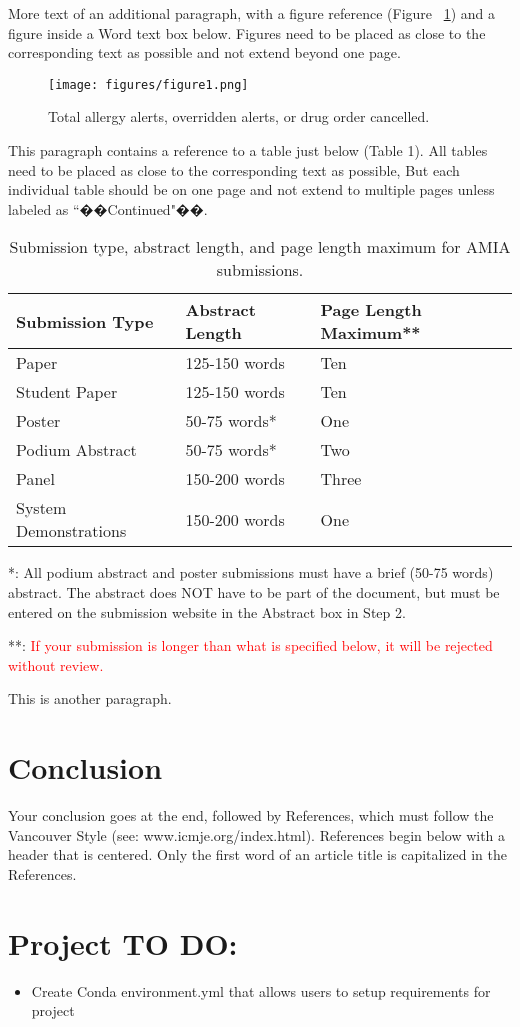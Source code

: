 \documentclass{amia}
\begin{document}
More text of an additional paragraph, with a figure reference (Figure ~\ref{fig1}) and a figure inside a Word text box
below.  Figures need to be placed as close to the corresponding text as possible and not extend beyond one page.\\
\begin{figure}[h!]
\centering
\texttt{[image: figures/figure1.png]}
\caption{Total allergy alerts, overridden alerts, or drug order cancelled.}
\label{fig1}
\end{figure}

This paragraph contains a reference to a table just below (Table 1).  All tables need to be placed as close to the 
corresponding text as possible, But each individual table should be on one page and not extend to multiple pages
 unless labeled as ``��Continued"��.

\begin{table}[h]
\centering
\caption{Submission type, abstract length, and page length maximum for AMIA submissions.}
  \begin{tabular}{|l|l|l|}
  \hline
    \textbf{Submission Type}    & \textbf{Abstract Length}  & \textbf{Page Length Maximum**} \\ \hline
    Paper  & 125-150 words  & Ten   \\ \hline
    Student Paper  & 125-150 words  & Ten \\ \hline
    Poster  &50-75 words*   & One \\ \hline
    Podium  Abstract & 50-75 words*  & Two \\ \hline
    Panel   &150-200 words  & Three \\ \hline
    System Demonstrations    &150-200 words  & One \\ \hline
  \end{tabular}
\end{table}
*: All podium abstract and poster submissions must have a brief (50-75 words) abstract. The abstract does NOT have to be part of the document, but must be entered on the submission website in the Abstract box in Step 2.

**: \textcolor{red}{If your submission is longer than what is specified below, it will be rejected without review.}

This is another paragraph.

\section*{Conclusion}
Your conclusion goes at the end, followed by References, which must follow the Vancouver Style (see: www.icmje.org/index.html).  References begin below with a header that is centered.  Only the first word of an article title is capitalized in the References. 

\section*{Project TO DO:}

\begin{itemize}
	\item Create Conda environment.yml that allows users to setup requirements for project
\end{itemize}



\end{document}
